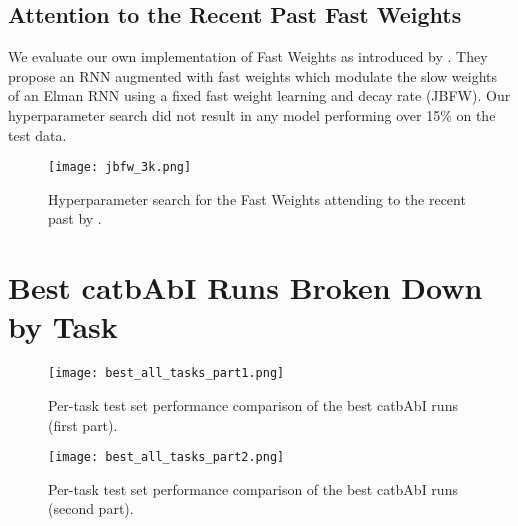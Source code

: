 \documentclass{article} \usepackage{iclr2021_conference,times}
\begin{document}
\subsection{Attention to the Recent Past Fast Weights}
\label{appendix:sec:jbfw_search}
We evaluate our own implementation of Fast Weights as introduced by \citet{Ba2016using}. They propose an RNN augmented with fast weights which modulate the slow weights of an Elman RNN using a fixed fast weight learning and decay rate (JBFW). Our hyperparameter search did not result in any model performing over 15\% on the test data. 
\begin{figure}[H]
  \centering
\texttt{[image: jbfw\_3k.png]}
  \caption{Hyperparameter search for the Fast Weights attending to the recent past by \citet{Ba2016using}.}
  \label{appendix:fig:jbfw3k}
\end{figure}

\section{Best catbAbI Runs Broken Down by Task}
\begin{figure}[H]
  \centering
  \vspace{-10pt}
  \texttt{[image: best\_all\_tasks\_part1.png]}
  \vspace{-10pt}
  \caption{Per-task test set performance comparison of the best catbAbI runs (first part).}
  \label{appendix:fig:best_all_tasks}
\end{figure}
\begin{figure}[H]
  \centering
  \vspace{-10pt}
  \texttt{[image: best\_all\_tasks\_part2.png]}
  \vspace{-10pt}
  \caption{Per-task test set performance comparison of the best catbAbI runs (second part).}
  \label{appendix:fig:best_all_tasks_part2}
\end{figure}

\newpage
\end{document}
